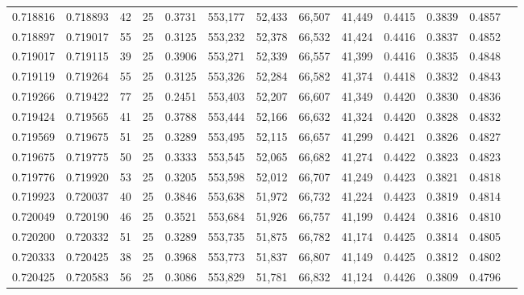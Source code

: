 \begin{tabular}{rrrrrrrrrrrrr}
0.718816 & 0.718893 &    42 &  25 &                                     0.3731 & 553,177 &  52,433 &  66,507 &  41,449 & 0.4415 & 0.3839 & 0.4857 \\
0.718897 & 0.719017 &    55 &  25 &                                     0.3125 & 553,232 &  52,378 &  66,532 &  41,424 & 0.4416 & 0.3837 & 0.4852 \\
0.719017 & 0.719115 &    39 &  25 &                                     0.3906 & 553,271 &  52,339 &  66,557 &  41,399 & 0.4416 & 0.3835 & 0.4848 \\
0.719119 & 0.719264 &    55 &  25 &                                     0.3125 & 553,326 &  52,284 &  66,582 &  41,374 & 0.4418 & 0.3832 & 0.4843 \\
0.719266 & 0.719422 &    77 &  25 &                                     0.2451 & 553,403 &  52,207 &  66,607 &  41,349 & 0.4420 & 0.3830 & 0.4836 \\
0.719424 & 0.719565 &    41 &  25 &                                     0.3788 & 553,444 &  52,166 &  66,632 &  41,324 & 0.4420 & 0.3828 & 0.4832 \\
0.719569 & 0.719675 &    51 &  25 &                                     0.3289 & 553,495 &  52,115 &  66,657 &  41,299 & 0.4421 & 0.3826 & 0.4827 \\
0.719675 & 0.719775 &    50 &  25 &                                     0.3333 & 553,545 &  52,065 &  66,682 &  41,274 & 0.4422 & 0.3823 & 0.4823 \\
0.719776 & 0.719920 &    53 &  25 &                                     0.3205 & 553,598 &  52,012 &  66,707 &  41,249 & 0.4423 & 0.3821 & 0.4818 \\
0.719923 & 0.720037 &    40 &  25 &                                     0.3846 & 553,638 &  51,972 &  66,732 &  41,224 & 0.4423 & 0.3819 & 0.4814 \\
0.720049 & 0.720190 &    46 &  25 &                                     0.3521 & 553,684 &  51,926 &  66,757 &  41,199 & 0.4424 & 0.3816 & 0.4810 \\
0.720200 & 0.720332 &    51 &  25 &                                     0.3289 & 553,735 &  51,875 &  66,782 &  41,174 & 0.4425 & 0.3814 & 0.4805 \\
0.720333 & 0.720425 &    38 &  25 &                                     0.3968 & 553,773 &  51,837 &  66,807 &  41,149 & 0.4425 & 0.3812 & 0.4802 \\
0.720425 & 0.720583 &    56 &  25 &                                     0.3086 & 553,829 &  51,781 &  66,832 &  41,124 & 0.4426 & 0.3809 & 0.4796 \\

\end{tabular}
